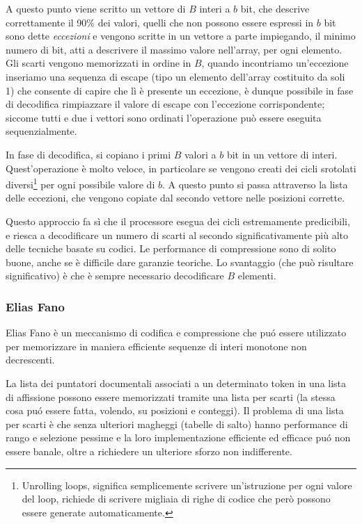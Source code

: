 A questo punto viene scritto un vettore di $B$ interi a $b$ bit, che descrive correttamente il 90\% dei valori, quelli che non possono essere espressi in $b$ bit sono dette \textit{eccezioni} e vengono scritte in un vettore a parte impiegando, il minimo numero di bit, atti a descrivere il massimo valore nell'array, per ogni elemento. Gli scarti vengono memorizzati in ordine in $B$, quando incontriamo un'eccezione inseriamo una sequenza di escape (tipo un elemento dell'array costituito da soli 1) che consente di capire che lì è presente un eccezione, è dunque possibile in fase di decodifica rimpiazzare il valore di escape con l'eccezione corrispondente; siccome tutti e due i vettori sono ordinati l'operazione può essere eseguita sequenzialmente.

In fase di decodifica, si copiano i primi $B$ valori a $b$ bit in un vettore di interi. Quest'operazione è molto veloce, in particolare se vengono creati dei cicli srotolati diversi\footnote{Unrolling loops, significa semplicemente scrivere un'istruzione per ogni valore del loop, richiede di scrivere migliaia di righe di codice che però possono essere generate automaticamente.} per ogni possibile valore di $b$. A questo punto si passa attraverso la lista delle eccezioni, che vengono copiate dal secondo vettore nelle posizioni corrette.

Questo approccio fa sì che il processore esegua dei cicli estremamente predicibili, e riesca a decodificare un numero di scarti al secondo significativamente più alto delle tecniche basate su codici. Le performance di compressione sono di solito buone, anche se è difficile dare garanzie teoriche. Lo svantaggio (che può risultare significativo) è che è sempre necessario decodificare $B$ elementi.
\subsubsection{Elias Fano}
Elias Fano è un meccanismo di codifica e compressione che puó essere utilizzato per memorizzare in maniera efficiente sequenze di interi monotone non decrescenti.

La lista dei puntatori documentali associati a un determinato token in una lista di affissione possono essere memorizzati tramite una lista per scarti (la stessa cosa puó essere fatta, volendo, su posizioni e conteggi). Il problema di una lista per scarti è che senza ulteriori magheggi (tabelle di salto) hanno performance di rango e selezione pessime e la loro implementazione efficiente ed efficace puó non essere banale, oltre a richiedere un ulteriore sforzo non indifferente.

